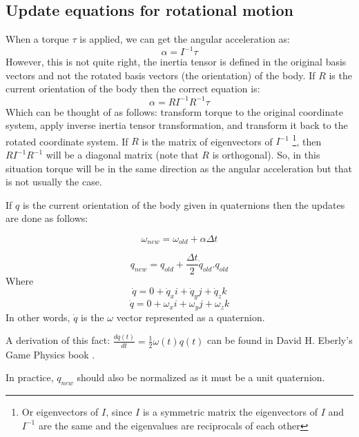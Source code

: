\subsection{Update equations for rotational motion}
When a torque $\tau$ is applied, we can get the angular acceleration as:
\[
\alpha=I^{-1}\tau
\]
However, this is not quite right, the inertia tensor is defined in the original basis vectors and not the rotated basis vectors (the orientation) of the body. If $R$ is the current orientation of the body then the correct equation is:
\[
\alpha=RI^{-1}R^{-1}\tau
\]
Which can be thought of as follows: transform torque to the original coordinate system, apply inverse inertia tensor transformation, and transform it back to the rotated coordinate system. If $R$ is the matrix of eigenvectors of $I^{-1}$ \footnote{Or eigenvectors of $I$, since $I$ is a symmetric matrix the eigenvectors of $I$ and $I^{-1}$ are the same and the eigenvalues are reciprocals of each other}, then $RI^{-1}R^{-1}$ will be a diagonal matrix (note that $R$ is orthogonal). So, in this situation torque will be in the same direction as the angular acceleration but that is not usually the case.

If $q$ is the current orientation of the body given in quaternions then the updates are done as follows:

\begin{equation}
\label{eq:angvel_update}
\omega_{new} = \omega_{old} + \alpha\Delta{t}
\end{equation}

\begin{equation}
\label{eq:orient_update}
q_{new} = q_{old} + \frac{\Delta{t}}{2}\dot{q}_{old}.q_{old}
\end{equation}
Where 
\[
\dot{q}=0+\dot{q}_xi+\dot{q}_yj+\dot{q}_zk
\]
\[
\dot{q}=0+\omega_xi+\omega_yj+\omega_zk
\]
In other words, $\dot{q}$ is the $\omega$ vector represented as a quaternion.

A derivation of this fact: $\frac{dq(t)}{dt}=\frac{1}{2}\omega(t)q(t)$ can be found in David H. Eberly's Game Physics book \cite{gamephy}.

In practice, $q_{new}$ should also be normalized as it must be a unit quaternion.

